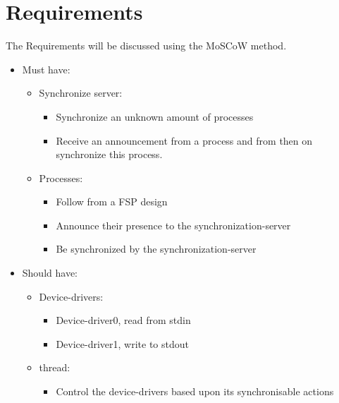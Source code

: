 \hypertarget{requirements}{%
\chapter{Requirements}\label{requirements}}

The Requirements will be discussed using the MoSCoW method.

\begin{itemize}
\tightlist
\item
  Must have:

  \begin{itemize}
  \tightlist
  \item
    Synchronize server:

    \begin{itemize}
    \tightlist
    \item
      Synchronize an unknown amount of processes
    \item
      Receive an announcement from a process and from then on
      synchronize this process.
    \end{itemize}
  \item
    Processes:

    \begin{itemize}
    \tightlist
    \item
      Follow from a FSP design
    \item
      Announce their presence to the synchronization-server
    \item
      Be synchronized by the synchronization-server
    \end{itemize}
  \end{itemize}
\item
  Should have:

  \begin{itemize}
  \tightlist
  \item
    Device-drivers:

    \begin{itemize}
    \tightlist
    \item
      Device-driver0, read from stdin
    \item
      Device-driver1, write to stdout
    \end{itemize}
  \item
    thread:

    \begin{itemize}
    \tightlist
    \item
      Control the device-drivers based upon its synchronisable actions
    \end{itemize}
  \end{itemize}
\end{itemize}
